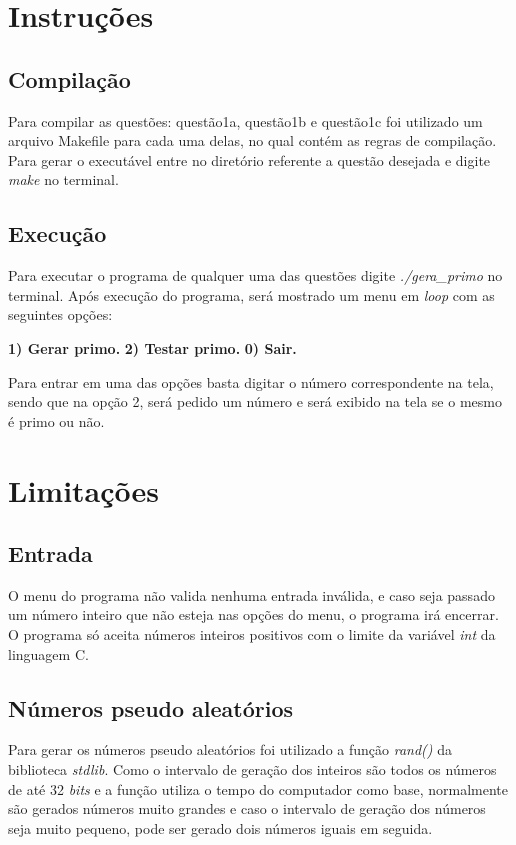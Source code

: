 
	\section{Instruções}
		\subsection{Compilação}

	  Para compilar as questões: questão1a, questão1b e questão1c  foi utilizado um arquivo Makefile para cada uma delas, no qual contém as regras de compilação. Para gerar o executável entre no diretório referente a questão desejada e digite \textit{make} no terminal.

	  \subsection{Execução}

	  Para executar o programa de qualquer uma das questões digite \textit{./gera\_primo} no terminal.
	  Após execução do programa, será mostrado um menu em \textit{loop} com as seguintes opções:

	  \textbf{1) Gerar primo.}
	  \textbf{2) Testar primo.}
	  \textbf{0) Sair.}

	  Para entrar em uma das opções basta digitar o número correspondente na tela, sendo que na opção 2, será pedido um número e será exibido na tela se o mesmo é primo ou não.

  \section{Limitações}

  	\subsection{Entrada}

  		O menu do programa não valida nenhuma entrada inválida, e caso seja passado um número inteiro que não esteja nas opções do menu, o programa irá encerrar.
  		O programa só aceita números inteiros positivos com o limite da variável \textit{int} da linguagem C.

  	\subsection{Números pseudo aleatórios}

  		Para gerar os números pseudo aleatórios foi utilizado a função \textit{rand()} da biblioteca \textit{stdlib}. Como o intervalo de geração dos inteiros são todos os números de até 32 \textit{bits} e a função utiliza o tempo do computador como base, normalmente são gerados números muito grandes e caso o intervalo de geração dos números seja muito pequeno, pode ser gerado dois números iguais em seguida.


